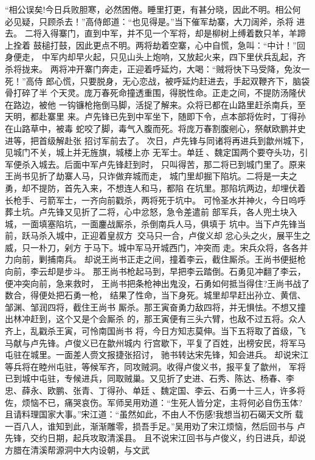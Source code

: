 “相公误矣!今日兵败胆寒，必然困倦。睡里打更，有甚分晓，因此不明。相公何
必见疑，只顾杀去！”高侍郎道：“也见得是。”当下催军劫寨，大刀阔斧，杀将
进去。
二将入得寨门，直到中军，并不见一个军将，却是柳树上缚着数只羊，羊蹄上拴着
鼓槌打鼓，因此更点不明。两将劫着空寨，心中自慌，急叫：“中计！”回身便走，
中军内却早火起，只见山头上炮响，又放起火来，四下里伏兵乱起，齐杀将拢来。
两将冲开寨门奔走，正迎着呼延灼，大喝：“贼将快下马受降，免汝一死！”高侍
郎心慌，只要脱身，无心恋战，被呼延灼赶进去，手起双鞭齐下，脑袋骨打碎了半
个天灵。庞万春死命撞透重围，得脱性命。正走之间，不提防汤隆伏在路边，被他
一钩镰枪拖倒马脚，活捉了解来。众将已都在山路里赶杀南兵，至天明，都赴寨里
来。卢先锋已先到中军坐下，随即下令，点本部将佐时，丁得孙在山路草中，被毒
蛇咬了脚，毒气入腹而死。将庞万春割腹剜心，祭献欧鹏并史进等，把首级解赴张
招讨军前去了。
次日，卢先锋与同诸将再进兵到歙州城下，见城门不关，城上并无旌旗，城楼上亦
无军士。单廷、魏定国两个要夺头功，引军便杀入城去。后面中军卢先锋赶到时，
只叫得苦，那二将已到城门里了。原来王尚书见折了劫寨人马，只诈做弃城而走，
城门里却掘下陷坑。二将是一夫之勇，却不提防，首先入来，不想连人和马，都陷
在坑里。那陷坑两边，却埋伏着长枪手、弓箭军士，一齐向前戳杀，两将死于坑中。
可怜圣水并神火，今日呜呼葬土坑。卢先锋又见折了二将，心中忿怒，急令差遣前
部军兵，各人兜土块入城，一面填塞陷坑，一面鏖战厮杀，杀倒南兵人马，俱填于
坑中。当下卢先锋当前，跃马杀入城中，正迎着皇叔方，交马只一合，卢俊义却
忿心头之火，展平生之威，只一朴刀，剁方于马下。城中军马开城西门，冲突而
走。宋兵众将，各各并力向前，剿捕南兵。
却说王尚书正走之间，撞着李云，截住厮杀。王尚书便挺枪向前，李云却是步斗。
那王尚书枪起马到，早把李云踏倒。石勇见冲翻了李云，便冲突向前，急来救时，
王尚书把条枪神出鬼没，石勇如何抵当得住?王尚书战了数合，得便处把石勇一枪，
结果了性命，当下身死。城里却早赶出孙立、黄信、邹渊、邹润四将，截住王尚书
厮杀。那王寅奋勇力敌四将，并无惧怯。不想又撞出林冲赶到，这个又是个会厮杀
的，那王寅便有三头六臂，也敌不过五将。众人齐上，乱戳杀王寅，可怜南国尚书
将，今日方知志莫伸。当下五将取了首级，飞马献与卢先锋。卢俊义已在歙州城内
行宫歇下，平复了百姓，出榜安民，将军马屯驻在城里。一面差人赍文报捷张招讨，
驰书转达宋先锋，知会进兵。
却说宋江等兵将在睦州屯驻，等候军齐，同攻贼洞。收得卢俊义书，报平复了歙州，
军将已到城中屯驻，专候进兵，同取贼巢。又见折了史进、石秀、陈达、杨春、李
忠、薛永、欧鹏、张青、丁得孙、单廷、魏定国、李云、石勇一十三人，许多将
佐，烦恼不已，痛哭哀伤。军师吴用劝道：“生死人皆分定，主将何必自伤玉体?
且请料理国家大事。”宋江道：“虽然如此，不由人不伤感!我想当初石碣天文所
载一百八人，谁知到此，渐渐雕零，损吾手足。”吴用劝了宋江烦恼，然后回书与
卢先锋，交约日期，起兵攻取清溪县。
且不说宋江回书与卢俊义，约日进兵，却说方腊在清溪帮源洞中大内设朝，与文武
